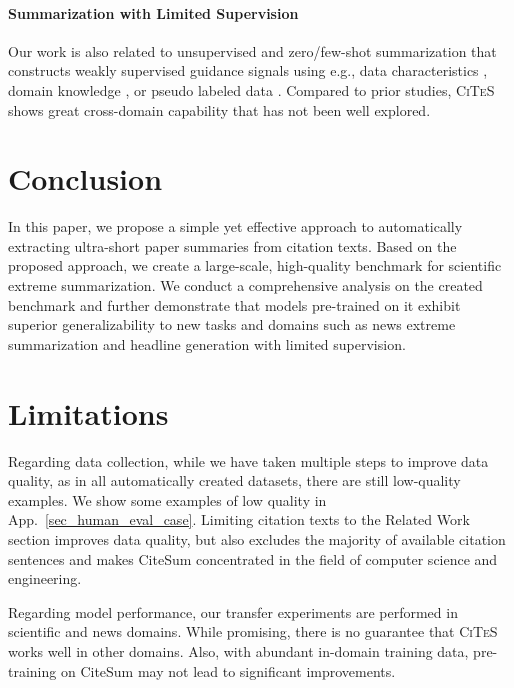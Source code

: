 \documentclass[11pt]{article}
\newcommand{\ours}{\textsc{CiTeS}\xspace}
\newcommand{\ourdata}{CiteSum\xspace}
\begin{document}
\paragraph{Summarization with Limited Supervision}
Our work is also related to unsupervised and zero/few-shot summarization that constructs weakly supervised guidance signals using e.g., data characteristics \cite{chu2019meansum,mao-etal-2020-multi}, domain knowledge \cite{zhu2021sumdocs}, or pseudo labeled data \cite{yang-etal-2020-ted,zhong2022unsupervised}. 
Compared to prior studies, \ours shows great cross-domain capability that has not been well explored.




\section{Conclusion}
In this paper, we propose a simple yet effective approach to automatically extracting ultra-short paper summaries from citation texts.
Based on the proposed approach, we create a large-scale, high-quality benchmark for scientific extreme summarization.
We conduct a comprehensive analysis on the created benchmark and further demonstrate that models pre-trained on it exhibit superior generalizability to new tasks and domains such as news extreme summarization and headline generation with limited supervision.

\section*{Limitations}
Regarding data collection, while we have taken multiple steps to improve data quality, as in all automatically created datasets, there are still low-quality examples. We show some examples of low quality in App.~\ref{sec_human_eval_case}.
Limiting citation texts to the Related Work section improves data quality, but also excludes the majority of available citation sentences and makes \ourdata concentrated in the field of computer science and engineering.

Regarding model performance, our transfer experiments are performed in scientific and news domains. While promising, there is no guarantee that \ours works well in other domains.
Also, with abundant in-domain training data, pre-training on \ourdata may not lead to significant improvements.







\end{document}
